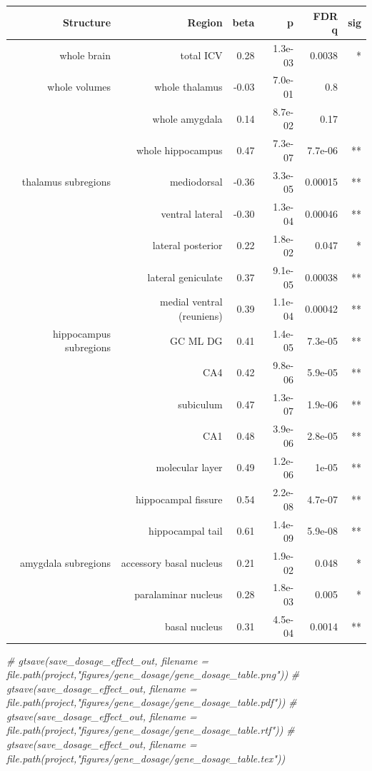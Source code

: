 \documentclass[
]{article}
\newenvironment{Shaded}{\begin{snugshade}}{\end{snugshade}}
\newcommand{\CommentTok}[1]{\textcolor[rgb]{0.56,0.35,0.01}{\textit{#1}}}
\begin{document}
\begin{longtable}{rrrrrr}
\toprule
Structure & Region & beta & p & FDR q & sig \\ 
\midrule\addlinespace[2.5pt]
whole brain & total ICV & 0.28 & 1.3e-03 & 0.0038 & * \\ 
whole volumes &  whole thalamus & -0.03 & 7.0e-01 & 0.8 &  \\ 
 & whole amygdala & 0.14 & 8.7e-02 & 0.17 &  \\ 
 & whole hippocampus & 0.47 & 7.3e-07 & 7.7e-06 & ** \\ 
thalamus subregions & mediodorsal & -0.36 & 3.3e-05 & 0.00015 & ** \\ 
 & ventral lateral & -0.30 & 1.3e-04 & 0.00046 & ** \\ 
 & lateral posterior & 0.22 & 1.8e-02 & 0.047 & * \\ 
 & lateral geniculate & 0.37 & 9.1e-05 & 0.00038 & ** \\ 
 & medial ventral (reuniens) & 0.39 & 1.1e-04 & 0.00042 & ** \\ 
hippocampus subregions & GC ML DG & 0.41 & 1.4e-05 & 7.3e-05 & ** \\ 
 & CA4 & 0.42 & 9.8e-06 & 5.9e-05 & ** \\ 
 & subiculum & 0.47 & 1.3e-07 & 1.9e-06 & ** \\ 
 & CA1 & 0.48 & 3.9e-06 & 2.8e-05 & ** \\ 
 & molecular layer & 0.49 & 1.2e-06 & 1e-05 & ** \\ 
 & hippocampal fissure & 0.54 & 2.2e-08 & 4.7e-07 & ** \\ 
 & hippocampal tail & 0.61 & 1.4e-09 & 5.9e-08 & ** \\ 
amygdala subregions & accessory basal nucleus & 0.21 & 1.9e-02 & 0.048 & * \\ 
 & paralaminar nucleus & 0.28 & 1.8e-03 & 0.005 & * \\ 
 & basal nucleus & 0.31 & 4.5e-04 & 0.0014 & ** \\ 
\bottomrule
\end{longtable}

\begin{Shaded}
\begin{Highlighting}[]
\CommentTok{\# gtsave(save\_dosage\_effect\_out, filename = file.path(project,"figures/gene\_dosage/gene\_dosage\_table.png"))}
\CommentTok{\# gtsave(save\_dosage\_effect\_out, filename = file.path(project,"figures/gene\_dosage/gene\_dosage\_table.pdf"))}
\CommentTok{\# gtsave(save\_dosage\_effect\_out, filename = file.path(project,"figures/gene\_dosage/gene\_dosage\_table.rtf"))}
\CommentTok{\# gtsave(save\_dosage\_effect\_out, filename = file.path(project,"figures/gene\_dosage/gene\_dosage\_table.tex"))}
\end{Highlighting}
\end{Shaded}
\end{document}
